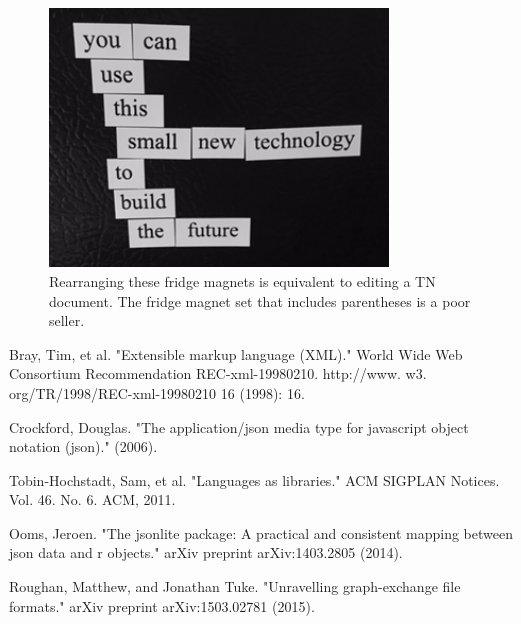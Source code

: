 \documentclass[journal]{IEEEtran}
\begin{document}
\begin{figure}[ht!]
\centering
\includegraphics[width=90mm]{tree.jpg}
\caption{Rearranging these fridge magnets is equivalent to editing a TN document. The fridge magnet set that includes parentheses is a poor seller.}
\end{figure}

\begin{thebibliography}{4}

Bray, Tim, et al. "Extensible markup language (XML)." World Wide Web Consortium Recommendation REC-xml-19980210. http://www. w3. org/TR/1998/REC-xml-19980210 16 (1998): 16.

Crockford, Douglas. "The application/json media type for javascript object notation (json)." (2006).

Tobin-Hochstadt, Sam, et al. "Languages as libraries." ACM SIGPLAN Notices. Vol. 46. No. 6. ACM, 2011.

Ooms, Jeroen. "The jsonlite package: A practical and consistent mapping between json data and r objects." arXiv preprint arXiv:1403.2805 (2014).

Roughan, Matthew, and Jonathan Tuke. "Unravelling graph-exchange file formats." arXiv preprint arXiv:1503.02781 (2015).

\end{thebibliography}

\ifCLASSOPTIONcaptionsoff
  \newpage
\fi
\end{document}
